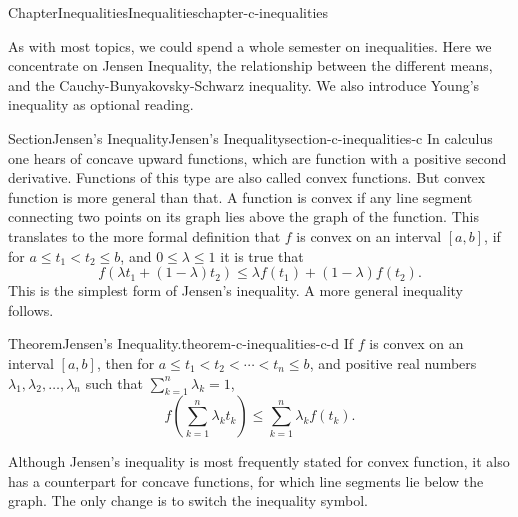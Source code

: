 \documentclass[oneside,10pt,]{book}
\numberwithin{equation}{section}
\newcommand{\lt}{<}
\begin{document}
%
%
\typeout{************************************************}
\typeout{************************************************}
%
\begin{chapterptx}{Chapter}{Inequalities}{}{Inequalities}{}{}{chapter-c-inequalities}
\renewcommand*{\chaptername}{Chapter}
\begin{introduction}{}%
As with most topics, we could spend a whole semester on inequalities.  Here we concentrate on Jensen Inequality,  the relationship between the different means, and the Cauchy-Bunyakovsky-Schwarz inequality. We also introduce Young's inequality as optional reading.%
\end{introduction}%
%
%
\typeout{************************************************}
\typeout{************************************************}
%
\begin{sectionptx}{Section}{Jensen's Inequality}{}{Jensen's Inequality}{}{}{section-c-inequalities-c}
%
In calculus one hears of concave upward functions, which are function with a positive second derivative.  Functions of this type are also called convex functions.  But convex function is more general than that.  A function is convex if any line segment connecting two points on its graph lies above the graph of the function. This translates to the more formal definition that \(f\) is convex on an interval \([a,b]\), if for \(a \leq t_1 \lt t_2 \leq b\), and \(0 \leq \lambda \leq 1\) it is true that%
\begin{equation*}
f(\lambda t_1 + (1-\lambda) t_2) \leq \lambda f(t_1)+(1-\lambda)f(t_2).
\end{equation*}
This is the simplest form of Jensen's inequality. A more general inequality follows.%
\begin{theorem}{Theorem}{Jensen's Inequality.}{}{theorem-c-inequalities-c-d}%
%
If \(f\) is convex on an interval \([a,b]\), then for \(a \leq t_1 \lt t_2 \lt \cdots \lt t_n \leq b\), and positive real numbers \(\lambda_1, \lambda_2, \dots, \lambda_n\) such that \(\sum_{k=1}^n \lambda_k =1\),%
\begin{equation*}
f\left(\sum_{k=1}^n \lambda_k t_k \right) \leq  \sum_{k=1}^n \lambda_k  f(t_k).
\end{equation*}
%
\end{theorem}
Although Jensen's inequality is most frequently stated for convex function, it also has a counterpart for concave functions, for which line segments lie below the graph.  The only change is to switch the inequality symbol.%

\end{sectionptx}
\end{chapterptx}
\end{document}
